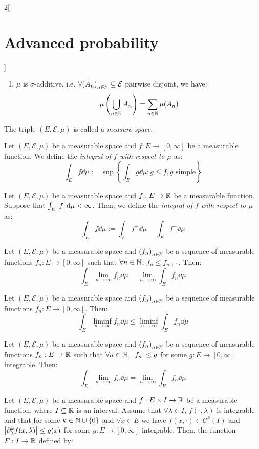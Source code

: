 \documentclass[../../../main_math.tex]{subfiles}
\begin{document}
\begin{multicols}{2}[\section{Advanced probability}]
\begin{definition}[Measure]
\begin{enumerate}
      \item $\mu$ is $\sigma$-additive, i.e. $\forall {(A_n)}_{n\in\mathbb{N}}\subseteq \mathcal{E}$ pairwise disjoint, we have:
            $$
              \mu\left(\bigcup_{n\in\mathbb{N}}{A_n}\right)=\sum_{n\in\mathbb{N}}{\mu(A_n)}
            $$
    \end{enumerate}
    The triple $(E,\mathcal{E},\mu)$ is called a \emph{measure space}.
  \end{definition}
  \begin{definition}
    Let $(E,\mathcal{E},\mu)$ be a measurable space and $f:E\to [0,\infty]$ be a measurable function. We define the \emph{integral of $f$ with respect to $\mu$} as:
    $$
      \int_E{f\dd{\mu}}:=\sup\left\{\int_E{g\dd{\mu}}:g\leq f, g\text{ simple}\right\}
    $$
  \end{definition}
  \begin{definition}
    Let $(E,\mathcal{E},\mu)$ be a measurable space and $f:E\to \mathbb{R}$ be a measurable function. Suppose that $\int_E{\abs{f}\dd{\mu}}<\infty$. Then, we define the \emph{integral of $f$ with respect to $\mu$} as:
    $$
      \int_E{f\dd{\mu}}:=\int_E{f^+\dd{\mu}}-\int_E{f^-\dd{\mu}}
    $$
  \end{definition}
  \begin{theorem}
    Let $(E,\mathcal{E},\mu)$ be a measurable space and ${(f_n)}_{n\in\mathbb{N}}$ be a sequence of measurable functions $f_n:E\to [0,\infty]$ such that $\forall n\in\mathbb{N}$, $f_n\leq f_{n+1}$. Then:
    $$
      \int_E{\lim_{n\to\infty}{f_n}\dd{\mu}}=\lim_{n\to\infty}{\int_E{f_n\dd{\mu}}}
    $$
  \end{theorem}
  \begin{theorem}
    Let $(E,\mathcal{E},\mu)$ be a measurable space and ${(f_n)}_{n\in\mathbb{N}}$ be a sequence of measurable functions $f_n:E\to [0,\infty]$. Then:
    $$
      \int_E{\liminf_{n\to\infty}{f_n}\dd{\mu}}\leq \liminf_{n\to\infty}{\int_E{f_n\dd{\mu}}}
    $$
  \end{theorem}
  \begin{theorem}
    Let $(E,\mathcal{E},\mu)$ be a measurable space and ${(f_n)}_{n\in\mathbb{N}}$ be a sequence of measurable functions $f_n:E\to \mathbb{R}$ such that $\forall n\in\mathbb{N}$, $\abs{f_n}\leq g$ for some $g:E\to [0,\infty]$ integrable. Then:
    $$
      \int_E{\lim_{n\to\infty}{f_n}\dd{\mu}}=\lim_{n\to\infty}{\int_E{f_n\dd{\mu}}}
    $$
  \end{theorem}
  \begin{proposition}
    Let $(E,\mathcal{E},\mu)$ be a measurable space and $f:E\times I\rightarrow \mathbb{R}$ be a measurable function, where $I\subseteq \mathbb{R}$ is an interval. Assume that $\forall \lambda\in I$, $f(\cdot,\lambda)$ is integrable and that for some $k\in \mathbb{N}\cup\{0\}$ and $\forall x\in E$ we have $f(x,\cdot)\in \mathcal{C}^k(I)$ and $\abs{\partial_\lambda^k f(x,\lambda)}\leq g(x)$ for some $g:E\to [0,\infty]$ integrable. Then, the function $F:I\to \mathbb{R}$ defined by:

\end{proposition}
\end{multicols}
\end{document}
